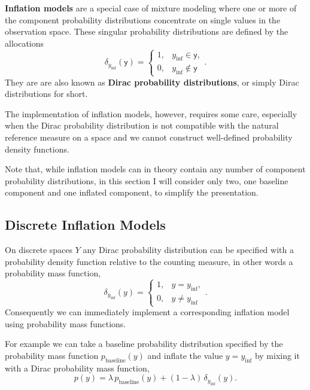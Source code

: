 \documentclass[
  letterpaper,
  DIV=11,
  numbers=noendperiod]{scrartcl}
\begin{document}
\textbf{Inflation models} are a special case of mixture modeling where
one or more of the component probability distributions concentrate on
single values in the observation space. These singular probability
distributions are defined by the allocations \[
\delta_{y_{\mathrm{inf}}}( \mathsf{y} )
=
\left\{
\begin{array}{rl}
1, & y_{\mathrm{inf}} \in    \mathsf{y}, \\
0, & y_{\mathrm{inf}} \notin \mathsf{y}
\end{array}
\right. .
\] They are are also known as \textbf{Dirac probability distributions},
or simply Dirac distributions for short.

The implementation of inflation models, however, requires some care,
especially when the Dirac probability distribution is not compatible
with the natural reference measure on a space and we cannot construct
well-defined probability density functions.

Note that, while inflation models can in theory contain any number of
component probability distributions, in this section I will consider
only two, one baseline component and one inflated component, to simplify
the presentation.

\subsection{Discrete Inflation Models}\label{discrete-inflation-models}

On discrete spaces \(Y\) any Dirac probability distribution can be
specified with a probability density function relative to the counting
measure, in other words a probability mass function, \[
\delta_{y_{\mathrm{inf}}}(y)
=
\left\{
\begin{array}{rl}
1, & y =   y_{\mathrm{inf}}, \\
0, & y \ne y_{\mathrm{inf}}
\end{array}
\right. .
\] Consequently we can immediately implement a corresponding inflation
model using probability mass functions.

For example we can take a baseline probability distribution specified by
the probability mass function \(p_{\mathrm{baseline}}(y)\) and inflate
the value \(y = y_{\mathrm{inf}}\) by mixing it with a Dirac probability
mass function, \[
p(y) =
  \lambda \, p_{\mathrm{baseline}}(y)
+ (1 - \lambda) \, \delta_{y_{\mathrm{inf}}}(y).
\]
\end{document}
